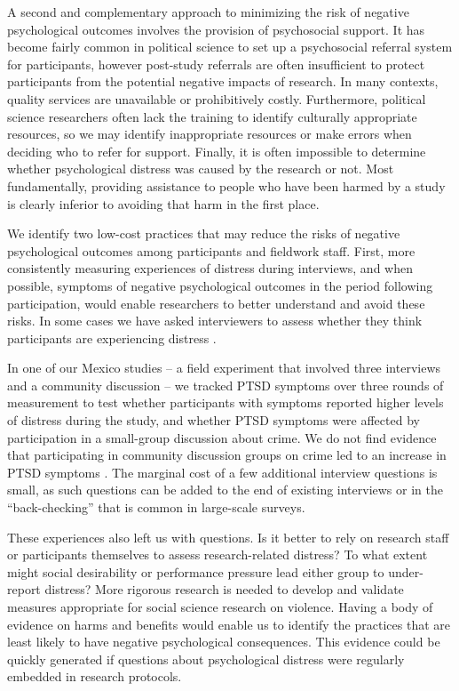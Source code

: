 A second and complementary approach to minimizing the risk of negative psychological outcomes involves the provision of psychosocial support. It has become fairly common in political science to set up a psychosocial referral system for participants, however post-study referrals are often insufficient to protect participants from the potential negative impacts of research. In many contexts, quality services are unavailable or prohibitively costly. Furthermore, political science researchers often lack the training to identify culturally appropriate resources, so we may identify inappropriate resources or make errors when deciding who to refer for support. Finally, it is often impossible to determine whether psychological distress was caused by the research or not. Most fundamentally, providing assistance to people who have been harmed by a study is clearly inferior to avoiding that harm in the first place. 


We identify two low-cost practices that may reduce the risks of negative psychological outcomes among participants and fieldwork staff. First, more consistently measuring experiences of distress during interviews, and when possible, symptoms of negative psychological outcomes in the period following participation, would enable researchers to better understand and avoid these risks. In some cases we have asked interviewers to assess whether they think participants are experiencing distress \citep{young2019psychology}. 

In one of our Mexico studies -- a field experiment that involved three interviews and a community discussion -- we tracked PTSD symptoms over three rounds of measurement to test whether participants with symptoms reported higher levels of distress during the study, and whether PTSD symptoms were affected by participation in a small-group discussion about crime. We do not find evidence that participating in community discussion groups on crime led to an increase in PTSD symptoms \citep{baron2020lab}. The marginal cost of a few additional interview questions is small, as such questions can be added to the end of existing interviews or in the ``back-checking'' that is common in large-scale surveys. 

These experiences also left us with questions. Is it better to rely on research staff or participants themselves to assess research-related distress? To what extent might social desirability or performance pressure lead either group to under-report distress? More rigorous research is needed to develop and validate measures appropriate for social science research on violence. Having a body of evidence on harms and benefits would enable us to identify the practices that are least likely to have negative psychological consequences. This evidence could be quickly generated if questions about psychological distress were regularly embedded in research protocols.

